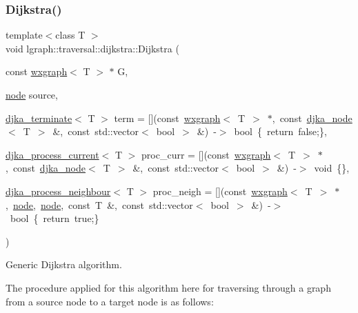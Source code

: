 \subsubsection{\texorpdfstring{Dijkstra()}{Dijkstra()}}
{\footnotesize\ttfamily template$<$class T $>$ \\
void lgraph\+::traversal\+::dijkstra\+::\+Dijkstra (\begin{DoxyParamCaption}\item[{const \hyperlink{classlgraph_1_1wxgraph}{wxgraph}$<$ T $>$ $\ast$}]{G,  }\item[{\hyperlink{namespacelgraph_a397169dd66adf725210a30fb7251773e}{node}}]{source,  }\item[{\hyperlink{namespacelgraph_1_1traversal_1_1dijkstra_afd9f50c2503c09300fff1bd48fad3aae}{djka\+\_\+terminate}$<$ T $>$}]{term = {\ttfamily \mbox{[}\mbox{]}(const~\hyperlink{classlgraph_1_1wxgraph}{wxgraph}$<$~T~$>$~$\ast$,~const~\hyperlink{namespacelgraph_1_1traversal_1_1dijkstra_ab54520d6f8049c8841128742624904a3}{djka\+\_\+node}$<$~T~$>$~\&,~const~std\+:\+:vector$<$~bool~$>$~\&)~-\/$>$~bool~\{~return~false;\}},  }\item[{\hyperlink{namespacelgraph_1_1traversal_1_1dijkstra_a6fd2792dd3d21438c17adc0187e99f66}{djka\+\_\+process\+\_\+current}$<$ T $>$}]{proc\+\_\+curr = {\ttfamily \mbox{[}\mbox{]}(const~\hyperlink{classlgraph_1_1wxgraph}{wxgraph}$<$~T~$>$~$\ast$,~const~\hyperlink{namespacelgraph_1_1traversal_1_1dijkstra_ab54520d6f8049c8841128742624904a3}{djka\+\_\+node}$<$~T~$>$~\&,~const~std\+:\+:vector$<$~bool~$>$~\&)~-\/$>$~void~\{\}},  }\item[{\hyperlink{namespacelgraph_1_1traversal_1_1dijkstra_a5e5d24edba3465d838a24b322a9d2a56}{djka\+\_\+process\+\_\+neighbour}$<$ T $>$}]{proc\+\_\+neigh = {\ttfamily \mbox{[}\mbox{]}(const~\hyperlink{classlgraph_1_1wxgraph}{wxgraph}$<$~T~$>$~$\ast$,~\hyperlink{namespacelgraph_a397169dd66adf725210a30fb7251773e}{node},~\hyperlink{namespacelgraph_a397169dd66adf725210a30fb7251773e}{node},~const~T~\&,~const~std\+:\+:vector$<$~bool~$>$~\&)~-\/$>$~bool~\{~return~true;\}} }\end{DoxyParamCaption})}



Generic Dijkstra algorithm. 

The procedure applied for this algorithm here for traversing through a graph from a source node to a target node is as follows\+:


